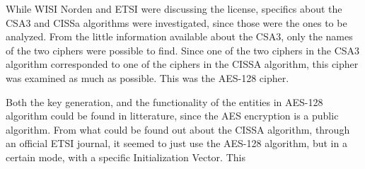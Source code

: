 While WISI Norden and ETSI were discussing the license, specifics about 
the CSA3 and CISSa algorithms were investigated, since those were the 
ones to be analyzed. From the little information available about 
the CSA3, only the names of the two ciphers were possible to find. 
Since one of the two ciphers in the CSA3 algorithm corresponded to one 
of the ciphers in the CISSA algorithm, this cipher was examined as much 
as possible. This was the AES-128 cipher.

Both the key generation, and the functionality of the entities in 
AES-128 algorithm could be found in litterature, since the AES 
encryption is a public algorithm. From what could be found out about 
the CISSA algorithm, through an official ETSI journal, it seemed to 
just use the AES-128 algorithm, but in a certain mode, with a specific 
Initialization Vector. This 
